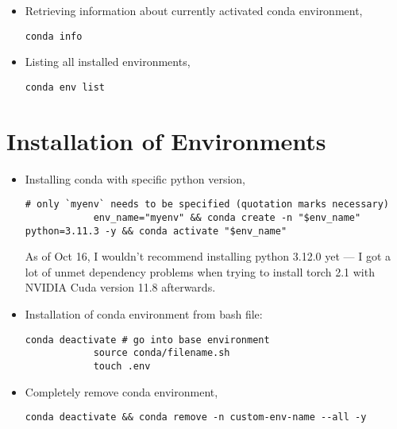 \documentclass[12pt, a4paper]{scrbook}
\numberwithin{equation}{section}
\theoremstyle{definition}
\theoremstyle{definition}
\begin{document}
	\begin{itemize}
		\item Retrieving information about currently activated conda environment,
		
		\begin{lstlisting}[style=mystylebash, label=alg:conda_info, xleftmargin=\parindent]
			conda info
		\end{lstlisting}
		
		\item Listing all installed environments, 
		
		\begin{lstlisting}[style=mystylebash, label=alg:conda_env_list, xleftmargin=\parindent]
			conda env list
		\end{lstlisting}
	
	\end{itemize}
	
	\section{Installation of Environments}
	
	\begin{itemize}
		\item Installing conda with specific python version,
		
		\begin{lstlisting}[style=mystylebash, label=alg:conda_env__creation_activation, xleftmargin=\parindent]
			# only `myenv` needs to be specified (quotation marks necessary)
			env_name="myenv" && conda create -n "$env_name" python=3.11.3 -y && conda activate "$env_name"
		\end{lstlisting} 
	
		As of Oct 16, I wouldn't recommend installing python 3.12.0 yet --- I got a lot of unmet dependency problems when trying to install torch 2.1 with NVIDIA Cuda version 11.8 afterwards. 
		
		\item Installation of conda environment from bash file: 
		
		\begin{lstlisting}[style=mystylepython, label=alg:conda_env__from_bash, xleftmargin=\parindent]
			conda deactivate # go into base environment
			source conda/filename.sh
			touch .env 
		\end{lstlisting}
		
		\item Completely remove conda environment, 
		
		\begin{lstlisting}[style=mystylebash, label=alg:conda_removal, xleftmargin=\parindent]
			conda deactivate && conda remove -n custom-env-name --all -y 
		\end{lstlisting}
	
	\end{itemize} 
\end{document}
